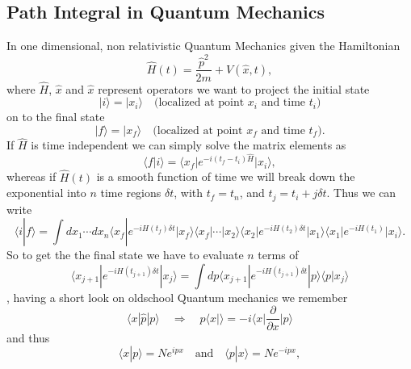 \subsection{Path Integral in Quantum Mechanics}
In one dimensional, non relativistic Quantum Mechanics given the Hamiltonian
\begin{equation}
	\hat H(t) = \frac{\hat p^2}{2m} + V(\hat x, t),
\end{equation}
where $\hat H$, $\hat x$ and $\hat x$ represent operators we want to project the initial state
\begin{equation}
	| i \rangle = | x_i \rangle \quad \text{(localized at point $x_i$ and time $t_i$)}
\end{equation}
on to the final state
\begin{equation}
	| f \rangle = | x_f \rangle \quad \text{(localized at point $x_f$ and time $t_f$)}.
\end{equation}
If $\hat H$ is time independent we can simply solve the matrix elements as
\begin{equation}
	\langle f | i \rangle = \langle x_f | e^{-i (t_f - t_i) \hat H} | x_i \rangle,
\end{equation}
whereas if $\hat H(t)$ is a smooth function of time we will break down the exponential into $n$ time regions $\delta t$, with $t_f = t_n$, and $t_j = t_i + j \delta t$. Thus we can write
\begin{equation}
	\langle i | f \rangle = \int dx_1 \cdots dx_n \langle x_f | e^{-i H(t_f) \delta t} | x_f \rangle \langle x_f | \cdots | x_2 \rangle \langle x_2 | e^{-i H(t_2) \delta t} | x_1 \rangle \langle x_1 | e^{-i H(t_1)} | x_i \rangle.
\end{equation}
So to get the the final state we have to evaluate $n$ terms of
\begin{equation}
	\langle x_{j+1} | e^{-i H(t_{j+1}) \delta t} | x_j \rangle = \int dp \langle x_{j+1} | e^{-i H(t_{j+1}) \delta t} | p \rangle \langle p | x_j \rangle 
\end{equation},
having a short look on oldschool Quantum mechanics we remember
\begin{equation}
	\langle x | \hat p | p \rangle \quad \Rightarrow \quad p \langle x | \rangle = - i \langle x | \frac{\partial}{\partial x} | p \rangle 
\end{equation}
and thus
\begin{equation}
	\langle x | p \rangle = N e^{i p x} \quad \text{and} \quad \langle p | x \rangle = N e^{-i px}, 
\end{equation}
